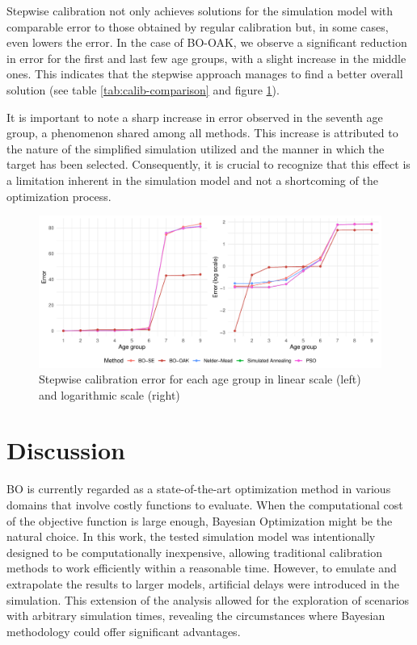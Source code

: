 \documentclass[sn-mathphys,Numbered]{sn-jnl}%
\begin{document}
Stepwise calibration not only achieves solutions for the simulation model with comparable error to those obtained by regular calibration but, in some cases, even lowers the error. In the case of BO-OAK, we observe a significant reduction in error for the first and last few age groups, with a slight increase in the middle ones. This indicates that the stepwise approach manages to find a better overall solution (see table \ref{tab:calib-comparison} and figure \ref{fig:stepwise-error}).

It is important to note a sharp increase in error observed in the seventh age group, a phenomenon shared among all methods. This increase is attributed to the nature of the simplified simulation utilized and the manner in which the target has been selected. Consequently, it is crucial to recognize that this effect is a limitation inherent in the simulation model and not a shortcoming of the optimization process.

\begin{figure}[h!]
	\centering	
	\includegraphics[width=\textwidth]{figs/stepwise_error.pdf}		
	\caption{Stepwise calibration error for each age group in linear scale (left) and logarithmic scale (right)}
	\label{fig:stepwise-error}	
\end{figure}

\section{Discussion}
BO is currently regarded as a state-of-the-art optimization method in various domains that involve costly functions to evaluate. When the computational cost of the objective function is large enough, Bayesian Optimization might be the natural choice. In this work, the tested simulation model was intentionally designed to be computationally inexpensive, allowing traditional calibration methods to work efficiently within a reasonable time. However, to emulate and extrapolate the results to larger models, artificial delays were introduced in the simulation. This extension of the analysis allowed for the exploration of scenarios with arbitrary simulation times, revealing the circumstances where Bayesian methodology could offer significant advantages.
\end{document}
